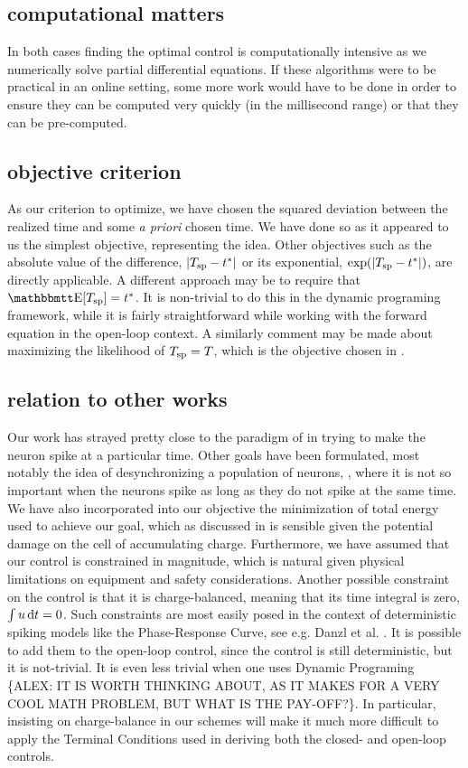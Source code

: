 \documentclass[12pt]{iopart}
\begin{document}
\subsection{computational matters}
In both cases finding the optimal control is computationally intensive as we
numerically solve partial differential equations. If these algorithms were to be
practical in an online setting, some more work would have to be done in order to
ensure they can be computed very quickly (in the millisecond range) or that
they can be pre-computed.

\subsection{objective criterion}
As our criterion to optimize, we have chosen the squared deviation between the
realized time and some {\sl a priori} chosen time. We have done so as it
appeared to us the simplest objective, representing the idea. Other
objectives such as the absolute value of the difference, $|{ T_{\textrm{sp} } } - { t^* }|$ or its
exponential, $\exp(|{ T_{\textrm{sp} } } - { t^* }|)$, are directly applicable. A different approach
may be to require that $\Exp[\ts] = \T$. It is non-trivial to do this in the
dynamic programing framework, while it is fairly straightforward while working
with the forward equation in the open-loop context. A similarly comment may be
made about maximizing the
likelihood of ${ T_{\textrm{sp} } } = T$, which is the objective chosen in \cite{Ahmadian2011}.

\subsection{relation to other works}
Our work has strayed pretty close to the paradigm of \cite{Ahmadian2011} in
trying to make the neuron spike at a particular time. Other goals have been
formulated, most notably the idea of desynchronizing a population of neurons,
\cite{Nabi2011}, where it is not so important when the neurons spike as long as
they do not spike at the same time. We have also incorporated into our objective
the minimization of total energy used to achieve our goal, which as discussed in
\cite{Ahmadian2011} is sensible given the potential damage on the cell of
accumulating charge. Furthermore, we have assumed that our control is
constrained in magnitude, which is natural given physical limitations on
equipment and safety considerations. Another possible constraint on the control
is that it is charge-balanced, meaning that its time integral is zero, $\int u
\, \mathrm{d} t = 0$. Such constraints are most easily posed in the context of
deterministic spiking models like the Phase-Response Curve, see e.g. Danzl et
al. \cite{Danzl2010}. It is possible to add them to the open-loop control, since
the control is still deterministic, but it is not-trivial. It is even less
trivial when one uses Dynamic Programing \{ALEX: IT IS WORTH THINKING ABOUT, AS
IT MAKES FOR A VERY COOL MATH PROBLEM, BUT WHAT IS THE PAY-OFF?\}. In
particular, insisting on charge-balance in our schemes will make it much more
difficult to apply the Terminal Conditions used in deriving both the closed- and
open-loop controls.
\end{document}
